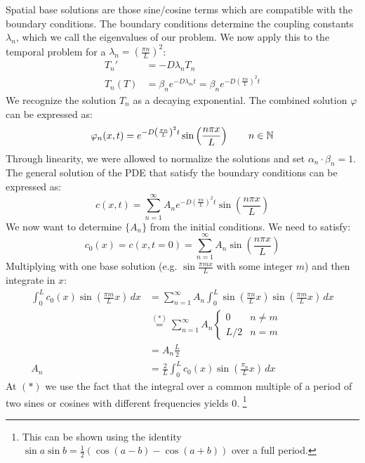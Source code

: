 Spatial base solutions are those sine/cosine terms which are compatible with the boundary conditions. The boundary conditions determine the coupling constants $\lambda_n$, which we call the eigenvalues of our problem. We now apply this to the temporal problem for a $\lambda_n = \left(\frac{\pi n}{L}\right)^2$:
\begin{equation*}
	\begin{split}
		T_n' &= -D\lambda_n T_n\\
		T_n(T)&=\beta_n e^{-D\lambda_m t} = \beta_n e^{-D\left(\frac{\pi n}{L}\right) ^2 t}
	\end{split}
\end{equation*}
We recognize the solution $T_n$ as a decaying exponential. The combined solution $\varphi$ can be expressed as:
\begin{equation*}
	\varphi_n(x,t) = e^{-D\left(\frac{\pi n}{L}\right) ^2 t} \sin\left(\frac{n\pi x}{L}\right)\qquad n \in \mathbb N\\
\end{equation*}
Through linearity, we were allowed to normalize the solutions and set $\alpha_n \cdot \beta_n = 1$.
The general solution of the PDE that satisfy the boundary conditions can be expressed as:
\begin{equation*}
	c(x,t)= \sum_{n=1}^\infty A_n e^{-D\left(\frac{\pi n}{L}\right) ^2 t} \sin\left(\frac{n\pi x}{L}\right)
\end{equation*}
We now want to determine $\{A_n\}$ from the initial conditions. We need to satisfy:
\begin{equation*}
	c_0(x) = c(x,t=0) = \sum_{n=1}^\infty A_n \sin\left(\frac{n\pi x}{L}\right)
\end{equation*}
Multiplying with one base solution (e.g. $\sin\frac{\pi mx}{L}$ with some integer $m$) and then integrate in $x$:
\begin{equation*}
	\begin{split}
		\int_0^L c_0(x)\sin\left(\frac{\pi m}{L}x \right) \,dx &= \sum_{n=1}^\infty A_n\int_0^L\sin\left(\frac{\pi n}{L} x \right)\sin\left(\frac{\pi m}{L} x \right)\,dx\\
		&\stackrel{(*)}{=}  \sum_{n=1}^\infty A_n\begin{cases}
			0 & n\ne m\\
			L/2 & n=m
		\end{cases}\\
		& = A_n \frac L2\\
		A_n & =\frac 2L \int_0^L c_0(x)\sin\left(\frac{\pi_n}Lx\right)\,dx
	\end{split}
\end{equation*}
At $(*)$ we use the fact that the integral over a common multiple of a period of two sines or cosines with different frequencies yields 0. \footnote{This can be shown using the identity $\sin a \sin b = \frac 12(\cos(a-b)-\cos(a+b))$ over a full period.}

